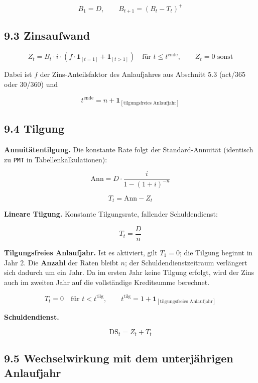 \documentclass[
  a4paper,
  10pt]{article}
\begin{document}
\[ B_1 = D, \qquad B_{t+1} = \left(B_t - T_t\right)^{+} \]

\hypertarget{zinsaufwand}{%
\subsection{9.3 Zinsaufwand}\label{zinsaufwand}}

\[ Z_t = B_t \cdot i \cdot \left(f \cdot \mathbf{1}_{[t=1]} + \mathbf{1}_{[t>1]}\right) \quad \text{für } t \leq t^{\mathrm{ende}}, \qquad Z_t = 0 \text{ sonst} \]

Dabei ist \(f\) der Zins-Anteilsfaktor des Anlaufjahres aus Abschnitt
5.3 (act/365 oder 30/360) und

\[ t^{\mathrm{ende}} = n + \mathbf{1}_{[\text{tilgungsfreies Anlaufjahr}]} \]

\hypertarget{tilgung}{%
\subsection{9.4 Tilgung}\label{tilgung}}

\textbf{Annuitätentilgung.} Die konstante Rate folgt der
Standard-Annuität (identisch zu \texttt{PMT} in Tabellenkalkulationen):

\[ \mathrm{Ann} = D \cdot \frac{i}{1 - (1+i)^{-n}} \]

\[ T_t = \mathrm{Ann} - Z_t \]

\textbf{Lineare Tilgung.} Konstante Tilgungsrate, fallender
Schuldendienst:

\[ T_t = \frac{D}{n} \]

\textbf{Tilgungsfreies Anlaufjahr.} Ist es aktiviert, gilt \(T_1 = 0\);
die Tilgung beginnt in Jahr 2. Die \textbf{Anzahl} der Raten bleibt
\(n\); der Schuldendienstzeitraum verlängert sich dadurch um ein Jahr.
Da im ersten Jahr keine Tilgung erfolgt, wird der Zins auch im zweiten
Jahr auf die vollständige Kreditsumme berechnet.

\[ T_t = 0 \quad \text{für } t < t^{\mathrm{tilg}}, \qquad t^{\mathrm{tilg}} = 1 + \mathbf{1}_{[\text{tilgungsfreies Anlaufjahr}]} \]

\textbf{Schuldendienst.}

\[ \mathrm{DS}_t = Z_t + T_t \]

\hypertarget{wechselwirkung-mit-dem-unterjuxe4hrigen-anlaufjahr}{%
\subsection{9.5 Wechselwirkung mit dem unterjährigen
Anlaufjahr}\label{wechselwirkung-mit-dem-unterjuxe4hrigen-anlaufjahr}}
\end{document}
